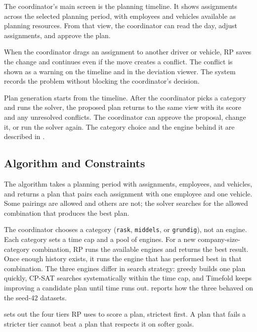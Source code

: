 The coordinator's main screen is the planning timeline. It shows assignments across the selected planning period, with employees and vehicles available as planning resources. From that view, the coordinator can read the day, adjust assignments, and approve the plan.

When the coordinator drags an assignment to another driver or vehicle, RP saves the change and continues even if the move creates a conflict. The conflict is shown as a warning on the timeline and in the deviation viewer. The system records the problem without blocking the coordinator's decision.

Plan generation starts from the timeline. After the coordinator picks a category and runs the solver, the proposed plan returns to the same view with its score and any unresolved conflicts. The coordinator can approve the proposal, change it, or run the solver again. The category choice and the engine behind it are described in .

\subsection{Algorithm and Constraints}
\label{sec:algorithm-implementation}

The algorithm takes a planning period with assignments, employees, and vehicles, and returns a plan that pairs each assignment with one employee and one vehicle. Some pairings are allowed and others are not; the solver searches for the allowed combination that produces the best plan.

The coordinator chooses a category (\texttt{rask}, \texttt{middels}, or \texttt{grundig}), not an engine. Each category sets a time cap and a pool of engines. For a new company-size-category combination, RP runs the available engines and returns the best result. Once enough history exists, it runs the engine that has performed best in that combination. The three engines differ in search strategy: greedy builds one plan quickly, CP-SAT searches systematically within the time cap, and Timefold keeps improving a candidate plan until time runs out.  reports how the three behaved on the seed-42 datasets.

 sets out the four tiers RP uses to score a plan, strictest first. A plan that fails a stricter tier cannot beat a plan that respects it on softer goals.


